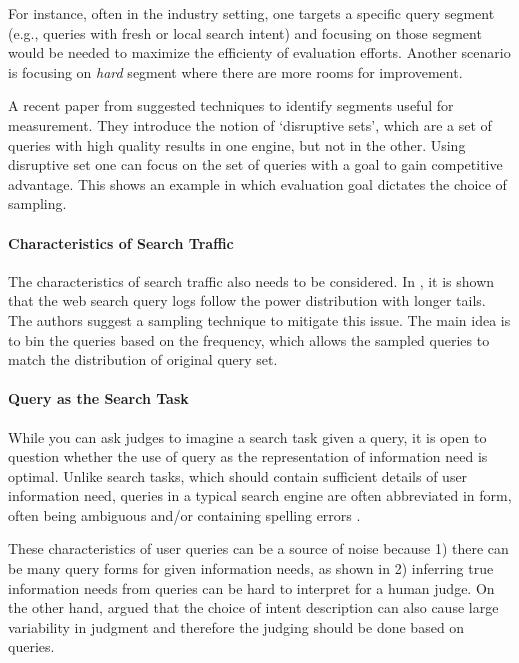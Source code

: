 \documentclass[openany]{now} %
\begin{document}
For instance, often in the industry setting, one targets a specific query segment (e.g., queries with fresh or local search intent) and focusing on those segment would be needed to maximize the efficienty of evaluation efforts. Another scenario is focusing on \textit{hard} segment where there are more rooms for improvement. 

A recent paper from  \cite{Zaragoza:2010} suggested techniques to identify segments useful for measurement. They introduce the notion of `disruptive sets', which are a set of queries with high quality results in one engine, but not in the other. Using disruptive set one can focus on the set of queries with a goal to gain competitive advantage. This shows an example in which evaluation goal dictates the choice of sampling.

\paragraph{Characteristics of Search Traffic} The characteristics of search traffic also needs to be considered. In \cite{Baeza-Yates:2015}, it is shown that the web search query logs follow the power distribution with longer tails. The authors suggest a sampling technique to mitigate this issue. The main idea is to bin the queries based on the frequency, which allows the sampled queries to match the distribution of original query set. 


\paragraph{Query as the Search Task} While you can ask judges to imagine a search task given a query, it is open to question whether the use of query as the representation of information need is optimal. Unlike search tasks, which should contain sufficient details of user information need, queries in a typical search engine are often abbreviated in form, often being ambiguous and/or containing spelling errors \cite{}.

These characteristics of user queries can be a source of noise because 1) there can be many query forms for given information needs, as shown in \cite{Bailey:2015:UVI} 2) inferring true information needs from queries can be hard to interpret for a human judge. On the other hand, \cite{Yilmaz:2014:EID} argued that the choice of intent description can also cause large variability in judgment and therefore the judging should be done based on queries.
\end{document}
